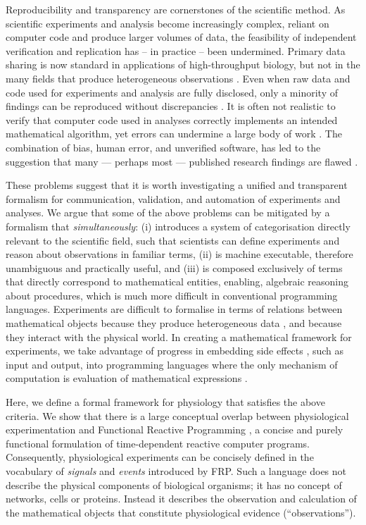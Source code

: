 Reproducibility and transparency are cornerstones of the scientific
method. As scientific experiments and analysis become increasingly
complex, reliant on computer code and produce larger volumes of data,
the feasibility of independent verification and replication has -- in
practice -- been undermined. Primary data sharing is now standard in
applications of high-throughput biology, but not in the many fields
that produce heterogeneous observations \citep{Gardner2005,
  Tukey1962}. Even when raw data and code used for experiments and
analysis are fully disclosed, only a minority of findings can be
reproduced without discrepancies \citep{Ioannidis2008,Baggerly2009,
  McCullough2007}. It is often not realistic to verify that computer
code used in analyses correctly implements an intended mathematical
algorithm, yet errors can undermine a large body of work
\citep{Chang2006}. The combination of bias, human error, and
unverified software, has led to the suggestion that many --- perhaps
most --- published research findings are flawed \citep{Ioannidis2005,
  Merali2010}.

These problems suggest that it is worth investigating a
unified and transparent formalism for communication, validation, and
automation of experiments and analyses. We argue that
some of the above problems can be mitigated by a formalism that
\emph{simultaneously}: (i) introduces a system of categorisation
directly relevant to the scientific field, such that scientists can
define experiments and reason about observations in familiar terms,
(ii) is machine executable, therefore unambiguous and practically
useful, and (iii) is composed exclusively of terms that directly
correspond to mathematical entities, enabling, algebraic reasoning
about procedures, which is much more difficult in conventional
programming languages.  Experiments are difficult to formalise in
terms of relations between mathematical objects because they produce
heterogeneous data \citep{Tukey1962}, and because they interact with
the physical world. In creating a mathematical framework for
experiments, we take advantage of progress in embedding side effects
\citep{PeytonJones2002, Roy2004, Wadler1995}, such as input and output,
into programming languages where the only mechanism of computation is
evaluation of mathematical expressions \citep{Church1941}.

Here, we define a formal framework for physiology
that satisfies the above criteria. We show that there
is a large conceptual overlap between physiological experimentation
and Functional Reactive Programming \citep[FRP; ][]{Elliott1997,
  Nilsson2002}, a concise and purely functional formulation of
time-dependent reactive computer programs. Consequently, physiological
experiments can be concisely defined in the vocabulary of
\emph{signals} and \emph{events} introduced by FRP. Such a language
does not describe the physical components of biological organisms; it
has no concept of networks, cells or proteins. Instead it describes
the observation and calculation of the mathematical objects that
constitute physiological evidence (``observations'').

